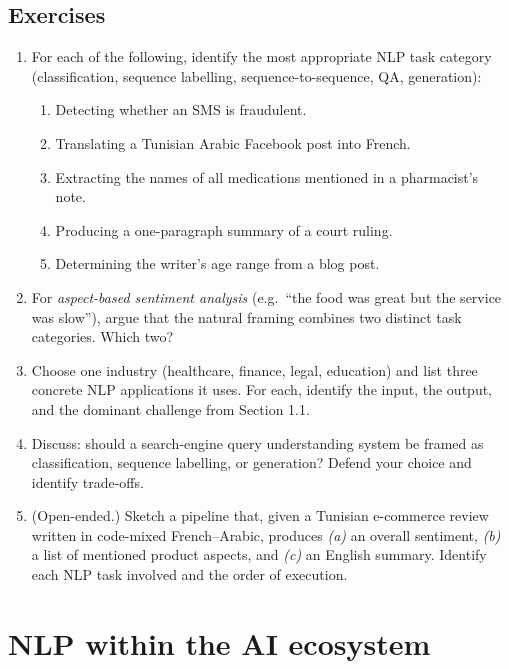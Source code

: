 \documentclass[12pt,a4paper]{report}
\theoremstyle{definition}
\theoremstyle{remark}
\begin{document}
\subsection{Exercises}
\begin{enumerate}
    \item For each of the following, identify the most appropriate NLP task category (classification, sequence labelling, sequence-to-sequence, QA, generation):
    \begin{enumerate}
        \item Detecting whether an SMS is fraudulent.
        \item Translating a Tunisian Arabic Facebook post into French.
        \item Extracting the names of all medications mentioned in a pharmacist's note.
        \item Producing a one-paragraph summary of a court ruling.
        \item Determining the writer's age range from a blog post.
    \end{enumerate}
    \item For \emph{aspect-based sentiment analysis} (e.g.\ ``the food was great but the service was slow''), argue that the natural framing combines two distinct task categories. Which two?
    \item Choose one industry (healthcare, finance, legal, education) and list three concrete NLP applications it uses. For each, identify the input, the output, and the dominant challenge from Section 1.1.
    \item Discuss: should a search-engine query understanding system be framed as classification, sequence labelling, or generation? Defend your choice and identify trade-offs.
    \item (Open-ended.) Sketch a pipeline that, given a Tunisian e-commerce review written in code-mixed French--Arabic, produces \emph{(a)} an overall sentiment, \emph{(b)} a list of mentioned product aspects, and \emph{(c)} an English summary. Identify each NLP task involved and the order of execution.
\end{enumerate}

\section{NLP within the AI ecosystem}
\end{document}
